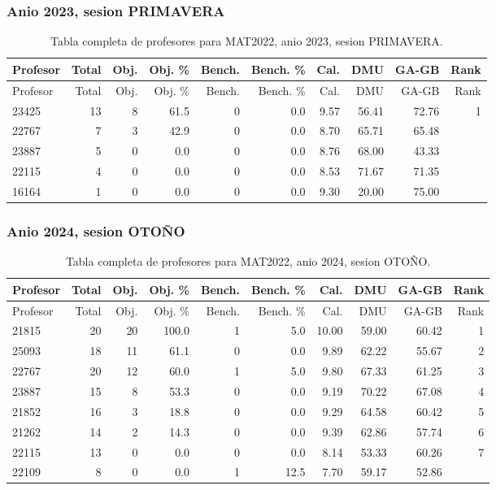\subsubsection{Anio 2023, sesion PRIMAVERA}

\begingroup
\scriptsize
\setlength{\tabcolsep}{3pt}
\begin{longtable}{lrrrrrrrrr}
\caption{Tabla completa de profesores para MAT2022, anio 2023, sesion PRIMAVERA.}\label{tab:prof-period-mat2022-2023-primavera}\\
\toprule
Profesor & Total & Obj. & Obj. \% & Bench. & Bench. \% & Cal. & DMU & GA-GB & Rank \\
\midrule
\endfirsthead
\toprule
Profesor & Total & Obj. & Obj. \% & Bench. & Bench. \% & Cal. & DMU & GA-GB & Rank \\
\midrule
\endhead
23425 & 13 & 8 & 61.5 & 0 & 0.0 & 9.57 & 56.41 & 72.76 & 1 \\
22767 & 7 & 3 & 42.9 & 0 & 0.0 & 8.70 & 65.71 & 65.48 &  \\
23887 & 5 & 0 & 0.0 & 0 & 0.0 & 8.76 & 68.00 & 43.33 &  \\
22115 & 4 & 0 & 0.0 & 0 & 0.0 & 8.53 & 71.67 & 71.35 &  \\
16164 & 1 & 0 & 0.0 & 0 & 0.0 & 9.30 & 20.00 & 75.00 &  \\
\bottomrule
\end{longtable}
\endgroup

\subsubsection{Anio 2024, sesion OTOÑO}

\begingroup
\scriptsize
\setlength{\tabcolsep}{3pt}
\begin{longtable}{lrrrrrrrrr}
\caption{Tabla completa de profesores para MAT2022, anio 2024, sesion OTOÑO.}\label{tab:prof-period-mat2022-2024-oto-o}\\
\toprule
Profesor & Total & Obj. & Obj. \% & Bench. & Bench. \% & Cal. & DMU & GA-GB & Rank \\
\midrule
\endfirsthead
\toprule
Profesor & Total & Obj. & Obj. \% & Bench. & Bench. \% & Cal. & DMU & GA-GB & Rank \\
\midrule
\endhead
21815 & 20 & 20 & 100.0 & 1 & 5.0 & 10.00 & 59.00 & 60.42 & 1 \\
25093 & 18 & 11 & 61.1 & 0 & 0.0 & 9.89 & 62.22 & 55.67 & 2 \\
22767 & 20 & 12 & 60.0 & 1 & 5.0 & 9.80 & 67.33 & 61.25 & 3 \\
23887 & 15 & 8 & 53.3 & 0 & 0.0 & 9.19 & 70.22 & 67.08 & 4 \\
21852 & 16 & 3 & 18.8 & 0 & 0.0 & 9.29 & 64.58 & 60.42 & 5 \\
21262 & 14 & 2 & 14.3 & 0 & 0.0 & 9.39 & 62.86 & 57.74 & 6 \\
22115 & 13 & 0 & 0.0 & 0 & 0.0 & 8.14 & 53.33 & 60.26 & 7 \\
22109 & 8 & 0 & 0.0 & 1 & 12.5 & 7.70 & 59.17 & 52.86 &  \\
\bottomrule
\end{longtable}
\endgroup

